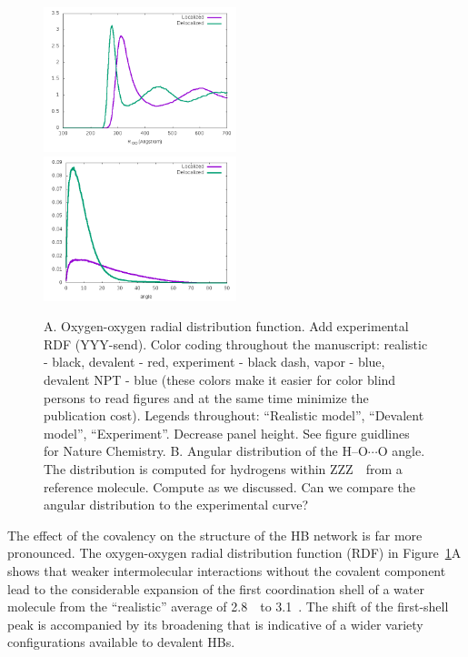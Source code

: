 \documentclass[prl,twocolumn,showpacs]{revtex4}
\begin{document}
\begin{figure}
\includegraphics[width=0.5\textwidth]{RDF}
\includegraphics[width=0.5\textwidth]{angular_dist}
\caption{A. Oxygen-oxygen radial distribution function. \new Add experimental RDF (YYY-send). Color coding throughout the manuscript: realistic - black, devalent - red, experiment - black dash, vapor - blue, devalent NPT - blue (these colors make it easier for color blind persons to read figures and at the same time minimize the publication cost). Legends throughout: ``Realistic model'', ``Devalent model'', ``Experiment''. Decrease panel height. See figure guidlines for Nature Chemistry. \old B. Angular distribution of the H--O$\cdots$O angle. The distribution is computed for hydrogens within ZZZ~\Ang\ from a reference molecule. \new Compute as we discussed. Can we compare the angular distribution to the experimental curve? \old} \label{Fig:RDF}
\end{figure}

The effect of the covalency on the structure of the HB network is far more pronounced. The oxygen-oxygen radial distribution function (RDF) in Figure~\ref{Fig:RDF}A shows that weaker intermolecular interactions without the covalent component lead to the considerable expansion of the first coordination shell of a water molecule from the ``realistic'' average of 2.8~\Ang\ to 3.1~\Ang. The shift of the first-shell peak is accompanied by its broadening that is indicative of a wider variety configurations available to devalent HBs. 
\end{document}
